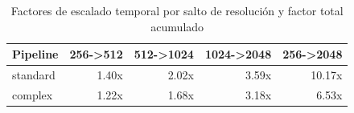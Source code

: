 \begin{table}[htbp]
\centering
\renewcommand{\arraystretch}{1.2}
\setlength{\tabcolsep}{7pt}
\begin{tabular}{|l|r|r|r|r|}
\hline
\rowcolor[gray]{0.90}
\textbf{Pipeline} & \textbf{256->512} & \textbf{512->1024} & \textbf{1024->2048} & \textbf{256->2048} \\
\hline
standard & 1.40x & 2.02x & 3.59x & 10.17x \\
\hline
complex & 1.22x & 1.68x & 3.18x & 6.53x \\
\hline
\end{tabular}
\caption{Factores de escalado temporal por salto de resolución y factor total acumulado}
\label{tab:resolution_scaling_summary_equipo1_float32}
\end{table}
